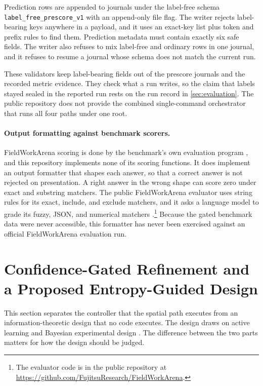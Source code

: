 \documentclass{article}
\begin{document}
Prediction rows are appended to journals under the label-free schema \texttt{label\_free\_prescore\_v1} with an append-only file flag. The writer rejects label-bearing keys anywhere in a payload, and it uses an exact-key list plus token and prefix rules to find them. Prediction metadata must contain exactly six safe fields. The writer also refuses to mix label-free and ordinary rows in one journal, and it refuses to resume a journal whose schema does not match the current run.

These validators keep label-bearing fields out of the prescore journals and the recorded metric evidence. They check what a run writes, so the claim that labels stayed sealed in the reported run rests on the run record in \cref{sec:evaluation}. The public repository does not provide the combined single-command orchestrator that runs all four paths under one root.

\paragraph{Output formatting against benchmark scorers.}
FieldWorkArena scoring is done by the benchmark's own evaluation program \citep{fieldworkarena2025}, and this repository implements none of its scoring functions. It does implement an output formatter that shapes each answer, so that a correct answer is not rejected on presentation. A right answer in the wrong shape can score zero under exact and substring matchers. The public FieldWorkArena evaluator uses string rules for its exact, include, and exclude matchers, and it asks a language model to grade its fuzzy, JSON, and numerical matchers \citep{fieldworkarena2025}.\footnote{The evaluator code is in the public repository at \url{https://github.com/FujitsuResearch/FieldWorkArena}.} Because the gated benchmark data were never accessible, this formatter has never been exercised against an official FieldWorkArena evaluation run.

\section{Confidence-Gated Refinement and a Proposed Entropy-Guided Design}
\label{sec:entropy}

This section separates the controller that the spatial path executes from an information-theoretic design that no code executes. The design draws on active learning \citep{settles2009active} and Bayesian experimental design \citep{chaloner1995bayesian}. The difference between the two parts matters for how the design should be judged.
\end{document}
